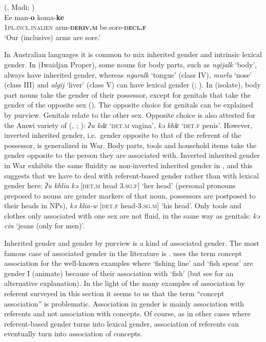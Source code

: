 \documentclass[output=collectionpaper]{langsci/langscibook}
\begin{document}
\ea\label{ex:WDG:10}
 (, Madi; \citealt[490]{Dixon2000})\\
\gll Ee 	man-\textbf{o} 	koma-\textbf{ke}\\
1\textsc{pl.incl.inalien} 	arm-\textbf{\textsc{deriv.m}} 	be.sore-\textbf{\textsc{decl.f}}\\
\glt `Our (inclusive) arms are sore.'\\
\z

In Australian languages it is common to mix inherited gender and intrinsic lexical gender. In  (Iwaidjan Proper), some nouns for body parts, such as  \textit{ngijalk} `body', always have inherited gender, whereas \textit{ngaralk} `tongue' (class IV), \textit{murlu} `nose' (class III) and \textit{algij} `liver' (class V) can have lexical gender (\citealt{Capell1970}; \citealt[5]{Evans1994}). In  (isolate), body part nouns take the gender of their possessor, except for genitals that take the gender of the opposite sex (\citealt[2]{Evans1994}). The opposite choice for genitals can be explained by purview. Genitals relate to the other sex. Opposite choice is also attested for the Amwi variety of  (, ; \citealt{Weidert1975}): \textit{ʔu kdɛ} `\textsc{det.m} vagina', \textit{kə khlɛ} `\textsc{det.f} penis'. However, inverted inherited gender, i.e.\ gender opposite to that of the referent of the possessor, is generalized in  War. Body parts, tools and household items take the gender opposite to the person they are associated with. Inverted inherited gender in  War exhibits the same fluidity as non-inverted inherited gender in , and this suggests that we have to deal with referent-based gender rather than with lexical gender here: \textit{ʔu khlia kə} [\textsc{det.m} head 3.\textsc{sg.f}] `her head' (personal pronouns preposed to nouns are gender markers of that noun, possessors are postposed to their heads in NPs), \textit{kə klia-w} [\textsc{det.f} head-3.\textsc{sg.m}] `his head'. Only tools and clothes only associated with one sex are not fluid, in the same way as genitals: \textit{kə cin} `jeans (only for men)'.

Inherited gender and gender by purview is a kind of associated gender. The most famous case of associated gender in the literature is . \cite[16]{Corbett1991} uses the term concept association for the well-known  examples where `fishing line' and `fish spear' are gender I (animate) because of their association with `fish' (but see \citealt{Plaster2007} for an alternative explanation). In the light of the many examples of association by referent surveyed in this section it seems to us that the term ``concept association'' is problematic. Association in gender is mainly association with referents and not association with concepts. Of course, as in other cases where referent-based gender turns into lexical gender, association of referents can eventually turn into association of concepts.
\end{document}
